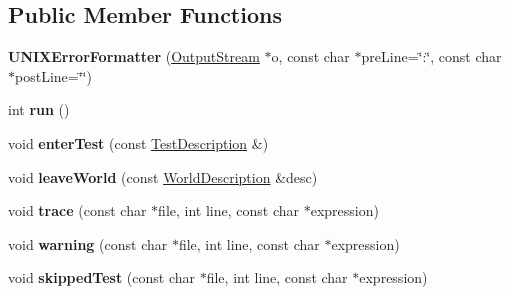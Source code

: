 \subsection*{Public Member Functions}
\begin{DoxyCompactItemize}
\item 
\hypertarget{classCxxTest_1_1UNIXErrorFormatter_ab6e90b862244b9903149166f2bfb7ad9}{{\bfseries U\-N\-I\-X\-Error\-Formatter} (\hyperlink{classCxxTest_1_1OutputStream}{Output\-Stream} $\ast$o, const char $\ast$pre\-Line=\char`\"{}\-:\char`\"{}, const char $\ast$post\-Line=\char`\"{}\char`\"{})}\label{classCxxTest_1_1UNIXErrorFormatter_ab6e90b862244b9903149166f2bfb7ad9}

\item 
\hypertarget{classCxxTest_1_1UNIXErrorFormatter_a36e4da1786593bcde8541e235ae1c9d4}{int {\bfseries run} ()}\label{classCxxTest_1_1UNIXErrorFormatter_a36e4da1786593bcde8541e235ae1c9d4}

\item 
\hypertarget{classCxxTest_1_1UNIXErrorFormatter_ab3f7b34797280437fe909e818cd5041f}{void {\bfseries enter\-Test} (const \hyperlink{classCxxTest_1_1TestDescription}{Test\-Description} \&)}\label{classCxxTest_1_1UNIXErrorFormatter_ab3f7b34797280437fe909e818cd5041f}

\item 
\hypertarget{classCxxTest_1_1UNIXErrorFormatter_ad4766a239cef808f14066e53f0fb47d9}{void {\bfseries leave\-World} (const \hyperlink{classCxxTest_1_1WorldDescription}{World\-Description} \&desc)}\label{classCxxTest_1_1UNIXErrorFormatter_ad4766a239cef808f14066e53f0fb47d9}

\item 
\hypertarget{classCxxTest_1_1UNIXErrorFormatter_ac0c4a49145b432dd38e12b5fedfc1275}{void {\bfseries trace} (const char $\ast$file, int line, const char $\ast$expression)}\label{classCxxTest_1_1UNIXErrorFormatter_ac0c4a49145b432dd38e12b5fedfc1275}

\item 
\hypertarget{classCxxTest_1_1UNIXErrorFormatter_abe1d8445dd2976991b60301a442dcdb8}{void {\bfseries warning} (const char $\ast$file, int line, const char $\ast$expression)}\label{classCxxTest_1_1UNIXErrorFormatter_abe1d8445dd2976991b60301a442dcdb8}

\item 
\hypertarget{classCxxTest_1_1UNIXErrorFormatter_a399ecddfd51a808ccf66ecdcf52d2658}{void {\bfseries skipped\-Test} (const char $\ast$file, int line, const char $\ast$expression)}\label{classCxxTest_1_1UNIXErrorFormatter_a399ecddfd51a808ccf66ecdcf52d2658}


\end{DoxyCompactItemize}
